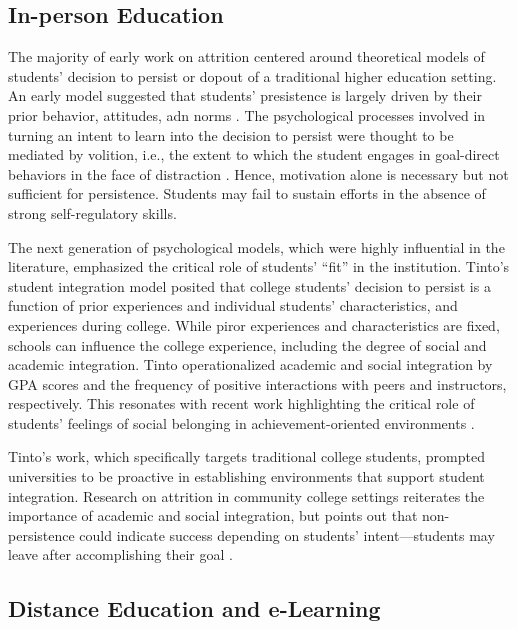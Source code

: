 \documentclass{sigchi}\usepackage[]{graphicx}\usepackage[]{color}
\begin{document}
\subsection{In-person Education}

The majority of early work on attrition centered around theoretical models of students' decision to persist or dopout of a traditional higher education setting. An early model suggested that students' presistence is largely driven by their prior behavior, attitudes, adn norms \cite{fishbein1975belief}. The psychological processes involved in turning an intent to learn into the decision to persist were thought to be mediated by volition, i.e., the extent to which the student engages in goal-direct behaviors in the face of distraction \cite{corno1993role}. Hence, motivation alone is necessary but not sufficient for persistence. Students may fail to sustain efforts in the absence of strong self-regulatory skills.

The next generation of psychological models, which were highly influential in the literature, emphasized the critical role of students' ``fit'' in the institution. Tinto's \citeyear{tinto1975dropout} student integration model posited that college students' decision to persist is a function of prior experiences and individual students' characteristics, and experiences during college. While piror experiences and characteristics are fixed, schools can influence the college experience, including the degree of social and academic integration. Tinto operationalized academic and social integration by GPA scores and the frequency of positive interactions with peers and instructors, respectively. This resonates with recent work highlighting the critical role of students' feelings of social belonging in achievement-oriented environments \cite{walton2011brief}. 

Tinto's work, which specifically targets traditional college students, prompted universities to be proactive in establishing environments that support student integration. Research on attrition in community college settings reiterates the importance of academic and social integration, but points out that non-persistence could indicate success depending on students' intent---students may leave after accomplishing their goal \cite{bers1991persistence}.

\subsection{Distance Education and e-Learning}
\end{document}
